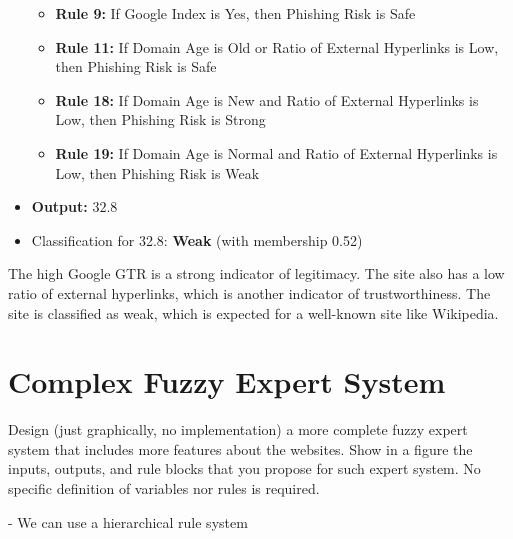 \documentclass[11pt]{article}
\begin{document}
\begin{itemize}
\begin{itemize}
        \item \textbf{Rule 9:} If Google Index is Yes, then Phishing Risk is Safe
        \item \textbf{Rule 11:} If Domain Age is Old or Ratio of External Hyperlinks is Low, then Phishing Risk is Safe
        \item \textbf{Rule 18:} If Domain Age is New and Ratio of External Hyperlinks is Low, then Phishing Risk is Strong
        \item \textbf{Rule 19:} If Domain Age is Normal and Ratio of External Hyperlinks is Low, then Phishing Risk is Weak
    \end{itemize}
    \item \textbf{Output:} $32.8$
    \item Classification for 32.8: \textbf{Weak} (with membership 0.52)
\end{itemize}

The high Google GTR is a strong indicator of legitimacy. The site also has a low ratio of external hyperlinks, which is another indicator of trustworthiness. The site is classified as weak, which is expected for a well-known site like Wikipedia.

\section{Complex Fuzzy Expert System}
Design (just graphically, no implementation) a more complete fuzzy expert system that 
includes more features about the websites. Show in a figure the inputs, outputs, and rule blocks 
that you propose for such expert system. No specific definition of variables nor rules is required. 

- We can use a hierarchical rule system

\newpage
\printbibliography
\end{document}
